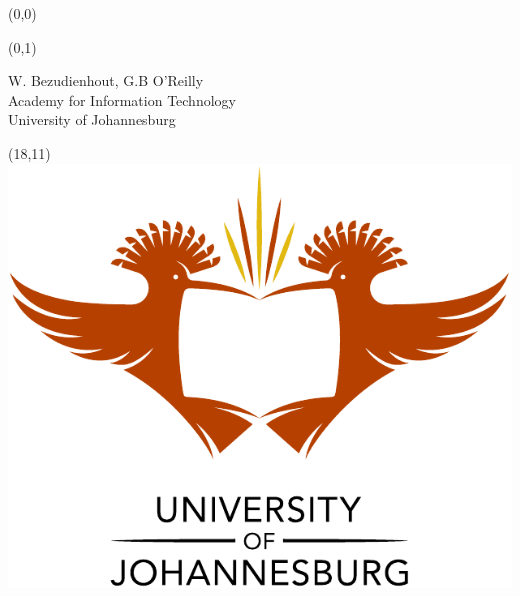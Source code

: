 \documentclass[portrait, a0]{a0poster}
\begin{document}
\begin{textblock}{26}(0,0)
    \centering
\end{textblock}

\begin{textblock}{26}(0,1)
 \begin{center}
   \Large{W. Bezudienhout, G.B O'Reilly} \\
   \Large{Academy for Information Technology} \\
   \Large{University of Johannesburg} \\
 \end{center}
\end{textblock}

\begin{textblock}{8}(18,11)
\centering
\includegraphics{pics/ujlogo.pdf}
\end{textblock}
\end{document}
